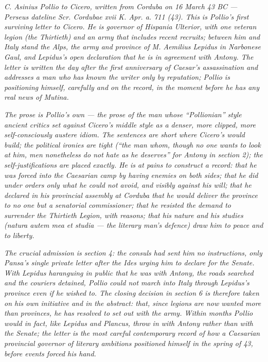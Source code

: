 
\textit{C. Asinius Pollio to Cicero, written from Corduba on
16 March 43 BC --- Perseus dateline \textit{Scr. Cordubae
xvii K. Apr. a. 711 (43)}. This is Pollio's first surviving
letter to Cicero. He is governor of Hispania Ulterior, with
one veteran legion (the Thirtieth) and an army that includes
recent recruits; between him and Italy stand the Alps, the
army and province of M. Aemilius Lepidus in Narbonese Gaul,
and Lepidus's open declaration that he is in agreement with
Antony. The letter is written the day after the first
anniversary of Caesar's assassination and addresses a man
who has known the writer only by reputation; Pollio is
positioning himself, carefully and on the record, in the
moment before he has any real news of Mutina.}

\textit{The prose is Pollio's own --- the prose of the man
whose ``Pollionian'' style ancient critics set against
Cicero's middle style as a denser, more clipped, more
self-consciously austere idiom. The sentences are short
where Cicero's would build; the political ironies are tight
(``the man whom, though no one wants to look at him, men
nonetheless do not hate as he deserves'' for Antony in
section 2); the self-justifications are placed exactly. He
is at pains to construct a record: that he was forced into
the Caesarian camp by having enemies on both sides; that he
did under orders only what he could not avoid, and visibly
against his will; that he declared in his provincial
assembly at Corduba that he would deliver the province to
no one but a senatorial commissioner; that he resisted the
demand to surrender the Thirtieth Legion, with reasons; that
his nature and his studies (\textit{natura autem mea et
studia} --- the literary man's defence) draw him to peace
and to liberty.}

\textit{The crucial admission is section 4: the consuls had
sent him no instructions, only Pansa's single private letter
after the Ides urging him to declare for the Senate. With
Lepidus haranguing in public that he was with Antony, the
roads searched and the couriers detained, Pollio could not
march into Italy through Lepidus's province even if he wished
to. The closing decision in section 6 is therefore taken on
his own initiative and in the abstract: that, since legions
are now wanted more than provinces, he has resolved to set
out with the army. Within months Pollio would in fact, like
Lepidus and Plancus, throw in with Antony rather than with
the Senate; the letter is the most careful contemporary
record of how a Caesarian provincial governor of literary
ambitions positioned himself in the spring of 43, before
events forced his hand.}
